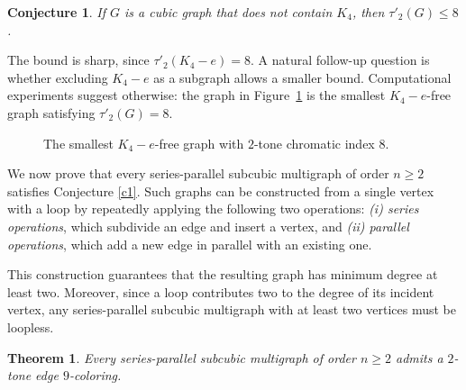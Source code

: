 \documentclass[12pt]{article}
\theoremstyle{plain}
\newtheorem{theorem}{Theorem}
\numberwithin{theorem}{section}
\newtheorem{conjecture}{Conjecture}
\numberwithin{conjecture}{section}
\numberwithin{corollary}{section}
\numberwithin{example}{section}
\numberwithin{lemma}{section}
\numberwithin{proposition}{section}
\numberwithin{problem}{section}
\numberwithin{remark}{section}
\numberwithin{claim}{theorem}
\numberwithin{definition}{section}
\begin{document}
\begin{conjecture}\label{c2}
If $G$ is a cubic graph that does not contain $K_4$, then $\tau'_2(G)\le 8$.
\end{conjecture}

The bound is sharp, since $\tau'_2(K_4-e)=8$. A natural follow-up question is whether excluding $K_4-e$ as a subgraph allows a smaller bound. Computational experiments suggest otherwise: the graph in Figure~\ref{f2} is the smallest $K_4-e$-free graph satisfying $\tau'_2(G)=8$.

\begin{figure}[ht]
\centering
{}
\caption{The smallest $K_4-e$-free graph with $2$-tone chromatic index $8$.}
\label{f2}
\end{figure}

We now prove that every series-parallel subcubic multigraph of order $n \ge 2$ satisfies Conjecture \ref{c1}. Such graphs can be constructed from a single vertex with a loop by repeatedly applying the following two operations: \emph{(i) series operations}, which subdivide an edge and insert a vertex, and  \emph{(ii) parallel operations}, which add a new edge in parallel with an existing one.  

This construction guarantees that the resulting graph has minimum degree at least two. Moreover, since a loop contributes two to the degree of its incident vertex, any series-parallel subcubic multigraph with at least two vertices must be loopless.

\begin{theorem}
Every series-parallel subcubic multigraph of order $n \ge 2$ admits a $2$-tone edge $9$-coloring.
\end{theorem}
\end{document}
